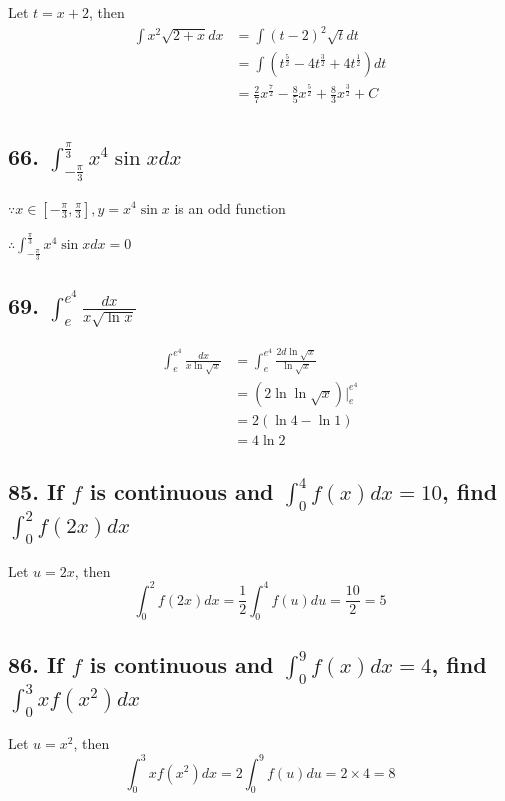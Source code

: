 \documentclass{article}
\begin{document}
    Let $t = x + 2$, then 
    $$\begin{aligned}
        \int x^2\sqrt{2 + x}dx &= \int(t - 2)^2\sqrt t dt \\
        &= \int (t^{\frac 5 2} - 4t^{\frac 3 2} + 4t^{\frac 1 2})dt \\
        &= \frac 2 7 x^{\frac 7 2} - \frac 8 5 x^{\frac 5 2} + \frac 8 3 x^{\frac 3 2} + C \\
    \end{aligned}$$


    \subsection*{66. $\int_{-\frac \pi 3}^{\frac \pi 3}x^4\sin x dx$}

    $\because x \in [-\frac \pi 3, \frac \pi 3], y = x^4\sin x$ is an odd function

    $\therefore \int_{-\frac \pi 3}^{\frac \pi 3}x^4\sin x dx = 0$

    \subsection*{69. $\int_e^{e^4} \frac{dx}{x\sqrt{\ln x}}$}

    $$\begin{aligned}
        \int_e^{e^4}\frac{dx}{x\ln \sqrt x} &= \int_e^{e^4} \frac{2d\ln \sqrt x}{\ln \sqrt x}  \\
        &= (2 \ln \ln \sqrt x) \biggl|_e^{e^4} \\
        &= 2(\ln 4 - \ln 1) \\
        &= 4\ln 2
    \end{aligned}$$

    \subsection*{85. If $f$ is continuous and $\int_0^4f(x)dx = 10$, find $\int_0^2f(2x)dx$}

    Let $u = 2x$, then $$\int_0^2f(2x)dx = \frac 1 2 \int_0^4f(u)du = \frac{10}{2} = 5$$

    \subsection*{86. If $f$ is continuous and $\int_0^9f(x)dx = 4$, find $\int_0^3xf(x^2)dx$}

    Let $u = x^2$, then $$\int_0^3xf(x^2)dx = 2 \int_0^9f(u)du = 2 \times 4 = 8$$
\end{document}
